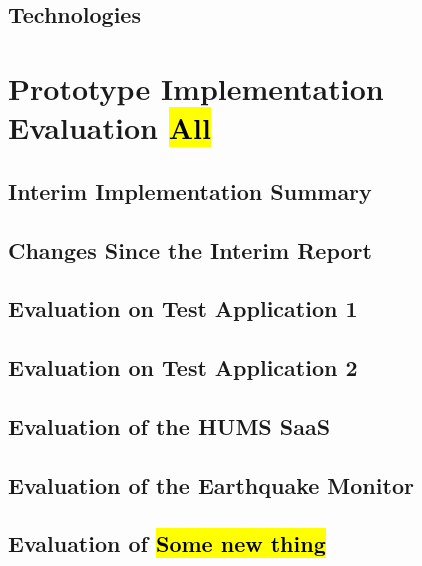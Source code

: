\documentclass[10pt,a4paper]{article}
\begin{document}
\subsection{Technologies}

\section{Prototype Implementation Evaluation \hl{All}}
\label{sec:prototype}


\subsection{Interim Implementation Summary}
\label{sec:interim_summary}


\subsection{Changes Since the Interim Report}
\label{sec:changes}

\subsection{Evaluation on Test Application 1}
\label{sec:test_app1}


\subsection{Evaluation on Test Application 2}
\label{sec:test_app2}


\subsection{Evaluation of the HUMS SaaS}
\label{sec:hums_saas}


\subsection{Evaluation of the Earthquake Monitor}
\label{sec:earthquake}


\subsection{Evaluation of \hl{Some new thing}}
\label{sec:new_thing} %


\end{document}
